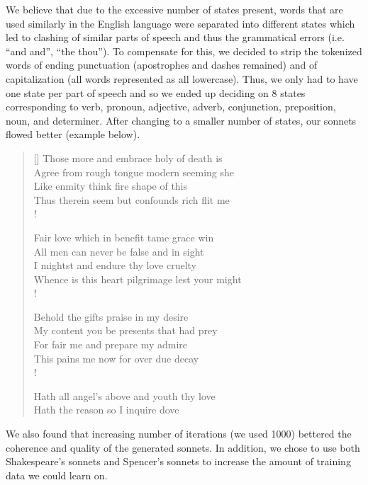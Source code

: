 \documentclass[11pt]{article}
\begin{document}
\noindent We believe that due to the excessive number of states present, words that are used similarly in the English language were separated into different states which led to clashing of similar parts of speech and thus the grammatical errors (i.e. ``and and'', ``the thou''). To compensate for this, we decided to strip the tokenized words of ending punctuation (apostrophes and dashes remained) and of capitalization (all words represented as all lowercase). Thus, we only had to have one state per part of speech and so we ended up deciding on 8 states corresponding to verb, pronoun, adjective, adverb, conjunction, preposition, noun, and determiner. After changing to a smaller number of states, our sonnets flowed better (example below). 
\settowidth{\versewidth}{Whence is this heart pilgrimage lest your might}
\begin{verse}[\versewidth]
Those more and embrace holy of death is \\
Agree from rough tongue modern seeming she \\
Like enmity think fire shape of this \\
Thus therein seem but confounds rich flit me \\!
 
Fair love which in benefit tame grace win \\
All men can never be false and in sight \\
I mightst and endure thy love cruelty \\
Whence is this heart pilgrimage lest your might \\!
 
Behold the gifts praise in my desire \\
My content you be presents that had prey \\ 
For fair me and prepare my admire \\
This pains me now for over due decay \\!
 
Hath all angel's above and youth thy love \\
Hath the reason so I inquire dove \\
\end{verse}

\noindent We also found that increasing number of iterations (we used 1000) bettered the coherence and quality of the generated sonnets. In addition, we chose to use both Shakespeare's sonnets and Spencer's sonnets to increase the amount of training data we could learn on. 
\end{document}
